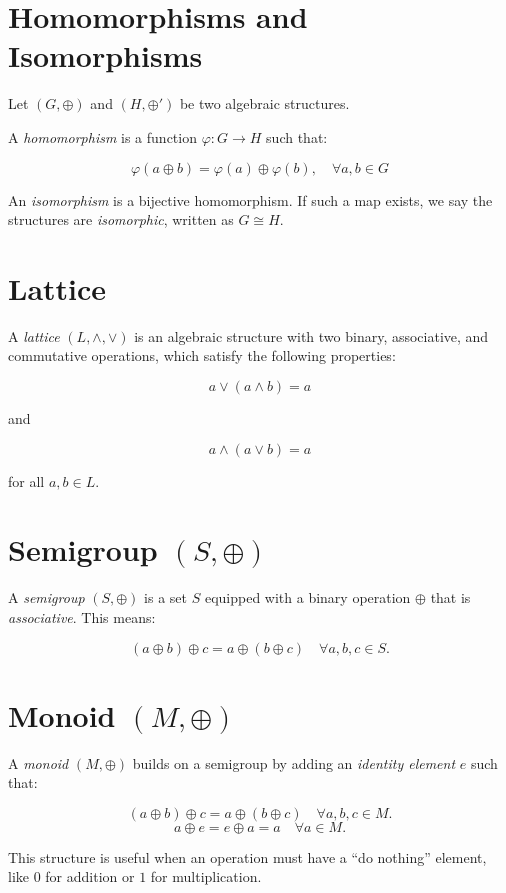 \section{Homomorphisms and Isomorphisms}

Let \((G, \oplus)\) and \((H, \oplus')\) be two algebraic structures.

A \emph{homomorphism} is a function \(\varphi: G \to H\) such that:

\[
	\varphi(a \oplus b) = \varphi(a) \oplus \varphi(b), \quad \forall a,b \in G
\]

An \emph{isomorphism} is a bijective homomorphism. If such a map exists, we say the structures are \emph{isomorphic},
written as \(G \cong H\).

\section{Lattice}

A \emph{lattice} \((L, \land, \lor)\) is an algebraic structure with two binary, associative, and commutative operations, which satisfy
the following properties:

\[
	a \lor (a \land b) = a
\]

and

\[
	a \land (a \lor b) = a
\]

for all \(a,b \in L\).

\section{Semigroup \texorpdfstring{\((S, \oplus)\)}{}}

A \emph{semigroup} \((S, \oplus)\) is a set \(S\) equipped with a binary operation \(\oplus\) that is \emph{associative}. This means:

\[
	(a \oplus b) \oplus c = a \oplus (b \oplus c) \quad \forall a, b, c \in S.
\]

\section{Monoid \texorpdfstring{\((M, \oplus)\)}{}}

A \emph{monoid} \((M, \oplus)\) builds on a semigroup by adding an \emph{identity element} \(e\) such that:

\[
	(a \oplus b) \oplus c = a \oplus (b \oplus c) \quad \forall a, b, c \in M.
\]
\[
	a \oplus e = e \oplus a = a \quad \forall a \in M.
\]

This structure is useful when an operation must have a ``do nothing'' element, like \(0\) for addition or \(1\) for multiplication.

